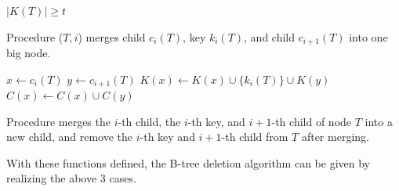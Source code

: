 \documentclass[b5paper]{article}
\begin{document}
\begin{algorithmic}[1]
  \State \Return $|K(T)| \ge t$
\EndFunction
\end{algorithmic}

Procedure ($T, i$) merges child $c_i(T)$, key $k_i(T)$,
and child $c_{i+1}(T)$ into one big node.

\begin{algorithmic}[1]
 
  \State $x \gets c_i(T)$
  \State $y \gets c_{i+1}(T)$
  \State $K(x) \gets K(x) \cup \{k_i(T)\} \cup K(y)$
  \State $C(x) \gets C(x) \cup C(y)$
  \State {}
  \State {}
\EndProcedure
\end{algorithmic}

Procedure  merges the $i$-th child, the $i$-th key,
and $i+1$-th child of node $T$ into a new child, and remove the
$i$-th key and $i+1$-th child from $T$ after merging.

With these functions defined, the B-tree deletion algorithm can be given by
realizing the above 3 cases.
\end{document}
